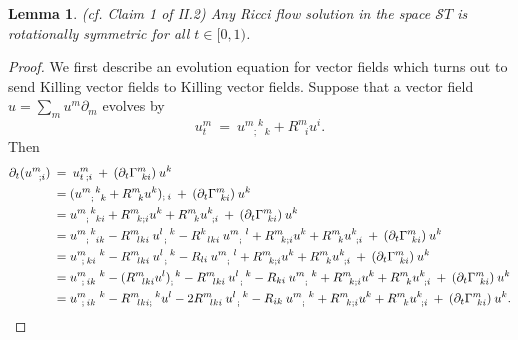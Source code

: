 \documentclass[12pt]{amsart}
\numberwithin{equation}{section}
\theoremstyle{plain}
\newtheorem{lemma}[equation]{Lemma}
\theoremstyle{definition}
\theoremstyle{remark}
\begin{document}
\begin{lemma} (cf. Claim 1 of II.2)
Any Ricci flow solution in the space ${\mathcal ST}$ is
rotationally symmetric for all $t \in [0,1)$.
\end{lemma}
\begin{proof}
We first describe an evolution equation for vector fields which
turns out to send Killing vector fields to Killing vector fields.
Suppose that a vector field $u = \sum_m u^m \partial_m$ evolves by
\begin{equation} \label{Killingevolution}
u^m_t \: = \: 
u^{m \: \: k}_{\: \: \: \: ;\: \: \:  k} + R^m_{\: \: \: i} u^i.
\end{equation}
Then
\begin{align} \label{bigmess1}
\partial_t (u^m_{\: \: \: ; i}) \: & = \:  u^m_{t \: ; i} \: + \:
(\partial_t \Gamma^m_{\: \: ki}) \: u^k \\
& = (u^{m \: \: k}_{\: \:
\: \: ;\: \: \:  k} + R^m_{\: \: \: k} u^k)_{; \: i} \: + \:
(\partial_t \Gamma^m_{\: \: ki}) \: u^k \notag \\
& = u^{m \: \: k}_{\: \: \: \: ;\: \: \:  ki} + R^m_{\: \: \: k;i} u^k +
R^m_{\: \: \: k} u^k_{\: \: ;i} \: + \:
(\partial_t \Gamma^m_{\: \: ki}) \: u^k \notag \\
& = u^{m \: \: k}_{\: \: \: \: ;\: \: \:  ik} -
R^m_{\: \: \: lki} \: u^{l \: \: \: k}_{\: \: ;} - R^k_{\: \: \: lki} \: 
u^{m \: \: \: l}_{\: \: \: \: ;}
+ R^m_{\: \: \: k;i} u^k +
R^m_{\: \: \: k} u^k_{\: \: ;i} \: + \:
(\partial_t \Gamma^m_{\: \: ki}) \: u^k \notag \\
& = u^{m \: \: \: \: \: \: k}_{\: \: ;\:ki} -
R^m_{\: \: \: lki} \: u^{l \: \: \: k}_{\: \: ;} - R_{li} \: 
u^{m \: \: \: l}_{\: \: \: \: ;}
+ R^m_{\: \: \: k;i} u^k +
R^m_{\: \: \: k} u^k_{\: \: ;i} \: + \:
(\partial_t \Gamma^m_{\: \: ki}) \: u^k \notag \\
& = u^{m \: \: \: \: \: \: k}_{\: \: ;\:ik} -
(R^m_{\: \: \: lki} u^l)_;^{\: \: k} -
R^m_{\: \: \: lki} \: u^{l \: \: \: k}_{\: \: ;} - R_{ki} \: 
u^{m \: \: \: k}_{\: \: \: \: ;}
+ R^m_{\: \: \: k;i} u^k +
R^m_{\: \: \: k} u^k_{\: \: ;i} \: + \:
(\partial_t \Gamma^m_{\: \: ki}) \: u^k \notag \\
& = u^{m \: \: \: \: \: \: k}_{\: \: ;\:ik} -
R^{m \: \: \: \: \: \: \: k}_{\: \: \: lki;} u^l -
2 R^m_{\: \: \: lki} \: u^{l \: \: \: k}_{\: \: ;} - R_{ik} \: 
u^{m \: \: \: k}_{\: \: \: \: ;}
+ R^m_{\: \: \: k;i} u^k +
R^m_{\: \: \: k} u^k_{\: \: ;i} \: + \:
(\partial_t \Gamma^m_{\: \: ki}) \: u^k. \notag
\end{align}

\end{proof}
\end{document}
